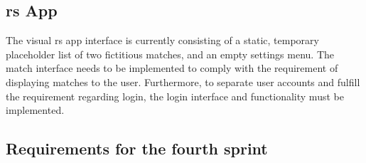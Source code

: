 \subsection{\gls{rs} App}
The visual \gls{rs} app interface is currently consisting of a static, temporary placeholder list of two fictitious matches, and an empty settings menu.
The match interface needs to be implemented to comply with the requirement of displaying matches to the user. Furthermore, to separate user accounts and fulfill the requirement regarding login, the login interface and functionality must be implemented.



\subsection{Requirements for the fourth sprint}
